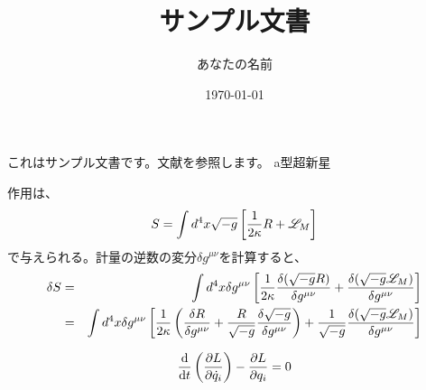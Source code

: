 \documentclass{japanese_thesis}
\title{サンプル文書}
\author{あなたの名前}
\date{\today}
\begin{document}
\maketitle
これはサンプル文書です。文献を参照します。
a型超新星

作用は、
\begin{eqnarray}\label{eq:EH_action}
    S=\int d^4x\sqrt{-g}\left[\frac{1}{2\kappa}R+\mathscr{L} _M \right]
\end{eqnarray}
で与えられる。計量の逆数の変分$\delta{g^{\mu\nu}}$を計算すると、
\begin{eqnarray}
    \delta{S}&=&\int d^4x \delta{g^{\mu\nu}}\left[\frac{1}{2\kappa}\fdv{(\sqrt{-g}R)}{g^{\mu\nu}}+\fdv{(\sqrt{-g}\lagrd_M)}{g^{\mu\nu}} \right]\\
    &=&\int d^4x \delta{g^{\mu\nu}}\left[\frac{1}{2\kappa}\left(\fdv{R}{g^{\mu\nu}}+\frac{R}{\sqrt{-g}}\fdv{\sqrt{-g}}{g^{\mu\nu}}\right)+\frac{1}{\sqrt{-g}}\fdv{(\sqrt{-g}\lagrd_M)}{g^{\mu\nu}} \right]\label{eq:EH_var}
\end{eqnarray}

\begin{eqnarray}
    \odv{}{t}\left(\pdv{L}{\dot{q}_i}\right)-\pdv{L}{q_i}=0
\end{eqnarray}

\nocite{*}
\printbibliography[title=参考文献]
\end{document}
